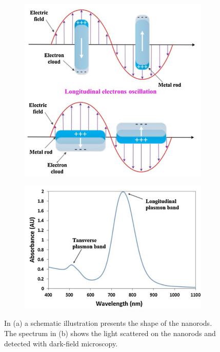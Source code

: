 \begin{figure}[ht]
    \centering
    \begin{subfigure}{0.48\linewidth}
      \includegraphics[width=\linewidth]{Bilder/Theory/Nanorod.png}
      \caption{}
      \label{fig:Nanorod}
    \end{subfigure}
    \hfill
    \begin{subfigure}{0.48\linewidth}
      \includegraphics[width=\linewidth]{Bilder/Theory/SpectrumNanorod.png}
      \caption{}
      \label{fig:SpecNanorod}
    \end{subfigure}
    \caption{In (a) a schematic illustration presents the shape of the nanorods. The spectrum in (b) shows the light scattered on the nanorods and detected with dark-field microscopy.}
    \label{fig:nanoplasmonics}
\end{figure}

